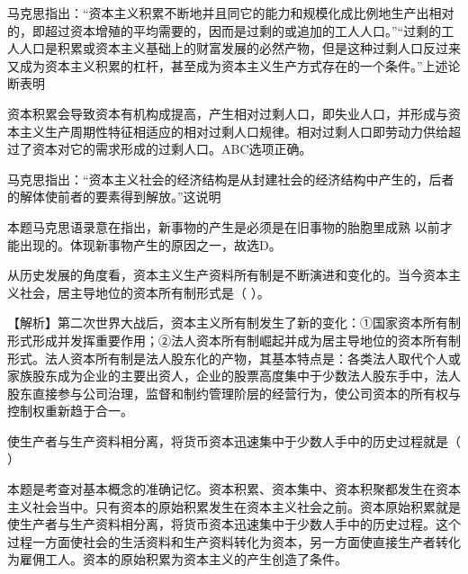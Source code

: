 \question 马克思指出：``资本主义积累不断地并且同它的能力和规模化成比例地生产出相对的，即超过资本增殖的平均需要的，因而是过剩的或追加的工人人口。''``过剩的工人人口是积累或资本主义基础上的财富发展的必然产物，但是这种过剩人口反过来又成为资本主义积累的杠杆，甚至成为资本主义生产方式存在的一个条件。''上述论断表明
\par{}
\begin{solution}资本积累会导致资本有机构成提高，产生相对过剩人口，即失业人口，并形成与资本主义生产周期性特征相适应的相对过剩人口规律。相对过剩人口即劳动力供给超过了资本对它的需求形成的过剩人口。ABC选项正确。
\end{solution}
\question 马克思指出：``资本主义社会的经济结构是从封建社会的经济结构中产生的，后者的解体使前者的要素得到解放。''这说明
\par{}
\begin{solution}本题马克思语录意在指出，新事物的产生是必须是在旧事物的胎胞里成熟
以前才能出现的。体现新事物产生的原因之一，故选D。
\end{solution}
\question 从历史发展的角度看，资本主义生产资料所有制是不断演进和变化的。当今资本主义社会，居主导地位的资本所有制形式是（
）。
\par{}
\begin{solution}【解析】第二次世界大战后，资本主义所有制发生了新的变化：①国家资本所有制形式形成并发挥重要作用；②法人资本所有制崛起并成为居主导地位的资本所有制形式。法人资本所有制是法人股东化的产物，其基本特点是：各类法人取代个人或家族股东成为企业的主要出资人，企业的股票高度集中于少数法人股东手中，法人股东直接参与公司治理，监督和制约管理阶层的经营行为，使公司资本的所有权与控制权重新趋于合一。
\end{solution}
\question 使生产者与生产资料相分离，将货币资本迅速集中于少数人手中的历史过程就是（
）
\par{}
\begin{solution}本题是考查对基本概念的准确记忆。资本积累、资本集中、资本积聚都发生在资本主义社会当中。只有资本的原始积累发生在资本主义社会之前。资本原始积累就是使生产者与生产资料相分离，将货币资本迅速集中于少数人手中的历史过程。这个过程一方面使社会的生活资料和生产资料转化为资本，另一方面使直接生产者转化为雇佣工人。资本的原始积累为资本主义的产生创造了条件。
\end{solution}
